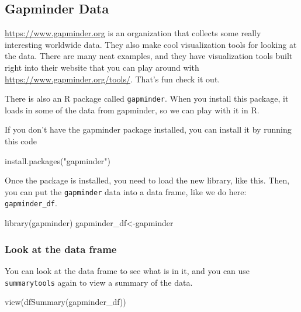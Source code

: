 \documentclass[
]{book}
\newenvironment{Shaded}{\begin{snugshade}}{\end{snugshade}}
\newcommand{\FunctionTok}[1]{\textcolor[rgb]{0.00,0.00,0.00}{#1}}
\newcommand{\NormalTok}[1]{#1}
\newcommand{\OtherTok}[1]{\textcolor[rgb]{0.56,0.35,0.01}{#1}}
\newcommand{\StringTok}[1]{\textcolor[rgb]{0.31,0.60,0.02}{#1}}
\begin{document}
\hypertarget{gapminder-data}{%
\subsection{Gapminder Data}\label{gapminder-data}}

\url{https://www.gapminder.org} is an organization that collects some really interesting worldwide data. They also make cool visualization tools for looking at the data. There are many neat examples, and they have visualization tools built right into their website that you can play around with \url{https://www.gapminder.org/tools/}. That's fun check it out.

There is also an R package called \texttt{gapminder}. When you install this package, it loads in some of the data from gapminder, so we can play with it in R.

If you don't have the gapminder package installed, you can install it by running this code

\begin{Shaded}
\begin{Highlighting}[]
\FunctionTok{install.packages}\NormalTok{(}\StringTok{"gapminder"}\NormalTok{)}
\end{Highlighting}
\end{Shaded}

Once the package is installed, you need to load the new library, like this. Then, you can put the \texttt{gapminder} data into a data frame, like we do here: \texttt{gapminder\_df}.

\begin{Shaded}
\begin{Highlighting}[]
\FunctionTok{library}\NormalTok{(gapminder)}
\NormalTok{gapminder\_df}\OtherTok{\textless{}{-}}\NormalTok{gapminder}
\end{Highlighting}
\end{Shaded}

\hypertarget{look-at-the-data-frame}{%
\subsubsection{Look at the data frame}\label{look-at-the-data-frame}}

You can look at the data frame to see what is in it, and you can use \texttt{summarytools} again to view a summary of the data.

\begin{Shaded}
\begin{Highlighting}[]
\FunctionTok{view}\NormalTok{(}\FunctionTok{dfSummary}\NormalTok{(gapminder\_df))}
\end{Highlighting}
\end{Shaded}
\end{document}

